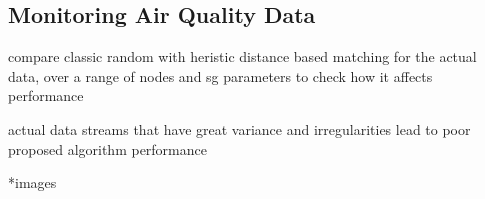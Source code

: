 \subsection{Monitoring Air Quality Data} \label{subsec:actualComp}

compare classic random with heristic distance based matching for the actual data, over a range of nodes and sg parameters to check how it affects performance

actual data streams that have great variance and irregularities lead to poor proposed algorithm performance

*images
